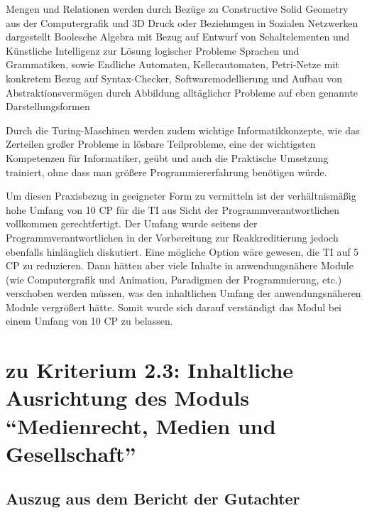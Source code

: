 Mengen und Relationen werden durch Bezüge zu Constructive Solid Geometry
aus der Computergrafik und 3D Druck oder Beziehungen in Sozialen
Netzwerken dargestellt Boolesche Algebra mit Bezug auf Entwurf von
Schaltelementen und Künstliche Intelligenz zur Lösung logischer Probleme
Sprachen und Grammatiken, sowie Endliche Automaten, Kellerautomaten,
Petri-Netze mit konkretem Bezug auf Syntax-Checker, Softwaremodellierung
und Aufbau von Abstraktionsvermögen durch Abbildung alltäglicher
Probleme auf eben genannte Darstellungsformen

Durch die Turing-Maschinen werden zudem wichtige Informatikkonzepte, wie
das Zerteilen großer Probleme in lösbare Teilprobleme, eine der
wichtigsten Kompetenzen für Informatiker, geübt und auch die Praktische
Umsetzung trainiert, ohne dass man größere Programmiererfahrung
benötigen würde.

Um diesen Praxisbezug in geeigneter Form zu vermitteln ist der
verhältnismäßig hohe Umfang von 10 CP für die TI aus Sicht der
Programmverantwortlichen vollkommen gerechtfertigt. Der Umfang wurde
seitens der Programmverantwortlichen in der Vorbereitung zur
Reakkreditierung jedoch ebenfalls hinlänglich diskutiert. Eine mögliche
Option wäre gewesen, die TI auf 5 CP zu reduzieren. Dann hätten aber
viele Inhalte in anwendungsnähere Module (wie Computergrafik und
Animation, Paradigmen der Programmierung, etc.) verschoben werden
müssen, was den inhaltlichen Umfang der anwendungsnäheren Module
vergrößert hätte. Somit wurde sich darauf verständigt das Modul bei
einem Umfang von 10 CP zu belassen.

\section{\texorpdfstring{zu Kriterium 2.3: Inhaltliche Ausrichtung
des Moduls ``Medienrecht, Medien und
Gesellschaft''\label{/mi-2017/selbstbericht/auflagen/0000-auflagen}}{zu Kriterium 2.3: Inhaltliche Ausrichtung des Moduls Medienrecht, Medien und Gesellschaft\label{/mi-2017/selbstbericht/auflagen/0000-auflagen}}}\label{zu-kriterium-2.3-inhaltliche-ausrichtung-des-moduls-medienrecht-medien-und-gesellschaftpathlabelmi-2017selbstberichtauflagen0000-auflagen}

\subsection{Auszug aus dem Bericht der
Gutachter\label{/mi-2017/selbstbericht/auflagen/0000-auflagen}}\label{auszug-aus-dem-bericht-der-gutachterpathlabelmi-2017selbstberichtauflagen0000-auflagen-2}


